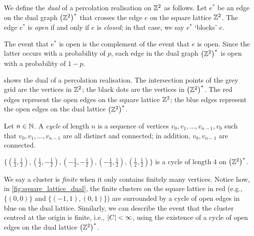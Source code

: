 \documentclass[a4paper, 12pt]{article}
\begin{document}
\begin{defn}\label{def:dual_percolation}
    We define the \textit{dual} of a percolation realisation on $\mathbb{Z}^2$ as follows. Let $e^*$ be an edge on the dual graph $\left(\mathbb{Z}^2\right)^*$ that crosses the edge $e$ on the square lattice $\mathbb{Z}^2$. The edge $e^*$ is \textit{open} if and only if $e$ is \textit{closed}; in that case, we say $e^*$ `blocks' $e$.
\end{defn}

\begin{rem*}
    The event that $e^*$ is open is the complement of the event that $e$ is open. Since the latter occurs with a probability of $p$, each edge in the dual graph $\left(\mathbb{Z}^2\right)^*$ is open with a probability of $1 - p$.
\end{rem*}

\begin{ex*}
     shows the dual of a percolation realisation. The intersection points of the grey grid are the vertices in $\mathbb{Z}^2$; the black dots are the vertices in $\left(\mathbb{Z}^2\right)^*$. The red edges represent the open edges on the square lattice $\mathbb{Z}^2$; the blue edges represent the open edges on the dual lattice $\left(\mathbb{Z}^2\right)^*$.
    
\end{ex*}

\begin{defn}\label{def:cycle}
    Let $n \in \mathbb{N}$. A \textit{cycle} of length $n$ is a sequence of vertices $v_0, v_1, \dots, v_{n - 1}, v_0$ such that $v_0, v_1, \dots, v_{n - 1}$ are all distinct and connected; in addition, $v_0, v_{n - 1}$ are connected.
\end{defn}
\begin{ex}\label{ex:cycle}
    $\{(\frac{1}{2}, \frac{1}{2}), (\frac{1}{2}, -\frac{1}{2}), (-\frac{1}{2}, -\frac{1}{2}), (-\frac{1}{2}, \frac{1}{2}), (\frac{1}{2}, \frac{1}{2})\}$ is a cycle of length $4$ on $\left(\mathbb{Z}^2\right)^*$.
\end{ex}

We say a cluster is \textit{finite} when it only contains finitely many vertices. Notice how, in \cref{fig:square_lattice_dual}, the finite clusters on the square lattice in red (e.g., $\{(0, 0)\}$ and $\{(-1, 1), (0, 1)\}$) are surrounded by a cycle of open edges in blue on the dual lattice. Similarly, we can describe the event that the cluster centred at the origin is finite, i.e., $\lvert C \rvert < \infty$, using the existence of a cycle of open edges on the dual lattice $\left(\mathbb{Z}^2\right)^*$.
\end{document}
